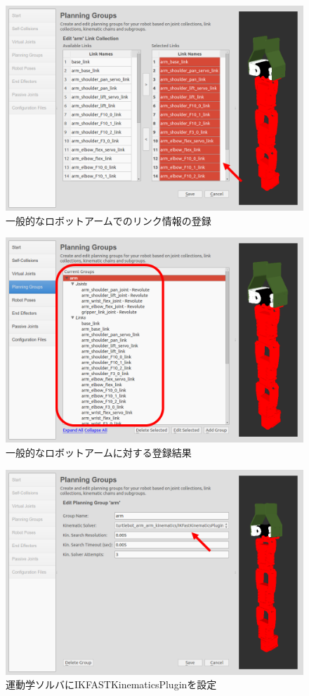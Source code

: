\begin{figure}[htp]
  \centering
  \includegraphics[width=12cm]{pictures/chapter11/pic_11_23.png}
  \caption{一般的なロボットアームでのリンク情報の登録}
\end{figure}

\begin{figure}[htp]
  \centering
  \includegraphics[width=12cm]{pictures/chapter11/pic_11_24.png}
  \caption{一般的なロボットアームに対する登録結果}
\end{figure}

\begin{figure}[htp]
  \centering
  \includegraphics[width=12cm]{pictures/chapter11/pic_11_25.png}
  \caption{運動学ソルバにIKFASTKinematicsPluginを設定}
\end{figure}

